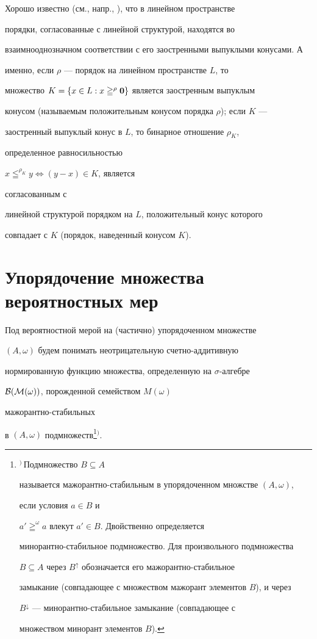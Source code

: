  


Хорошо известно (см., напр., \cite{3}), что в линейном пространстве 


порядки, согласованные с линейной структурой, находятся во 


взаимнооднозначном соответствии с его заостренными выпуклыми конусами. А 


именно, если $\rho$ --- порядок на линейном пространстве $L$, то 


множество $K=\{x\in L:x\geqq^\rho\bold 0\}$ является заостренным выпуклым 


конусом (называемым положительным конусом порядка $\rho$); если $K$ --- 


заостренный выпуклый конус в $L$, то бинарное отношение $\rho_K$, 


определенное равносильностью 


$x\leqq^{\rho_K}y\Longleftrightarrow(y-x)\in K$, является 


согласованным с 


линейной структурой порядком на $L$, положительный конус которого 


совпадает с $K$ (порядок, наведенный конусом $K$). 


 


\section{Упорядочение множества вероятностных мер} 


 


Под вероятностной мерой на (частично) упорядоченном множестве 


$(A,\omega)$ будем понимать неотрицательную счетно-аддитивную 


нормированную функцию множества, определенную на $\sigma$-алгебре 


$\cal B(M(\omega))$, порожденной семейством $M(\omega)$ 


мажорантно-стабильных 


в $(A,\omega)$ подмножеств\footnote{${}^)$\,Подмножество $B\subseteq A$ 


называется мажорантно-стабильным в упорядоченном множстве $(A,\omega)$, 


если условия $a\in B$ и 


$a'\geqq^\omega a$ влекут $a'\in B$. Двойственно определяется 


минорантно-стабильное подмножество. Для произвольного подмножества 


$B\subseteq A$ через $B^\uparrow$ обозначается его мажорантно-стабильное 


замыкание (совпадающее с множеством мажорант элементов $B$), и через 


$B^\downarrow$ --- минорантно-стабильное замыкание (совпадающее с 


множеством минорант элементов $B$).}{${}^)$}. 


